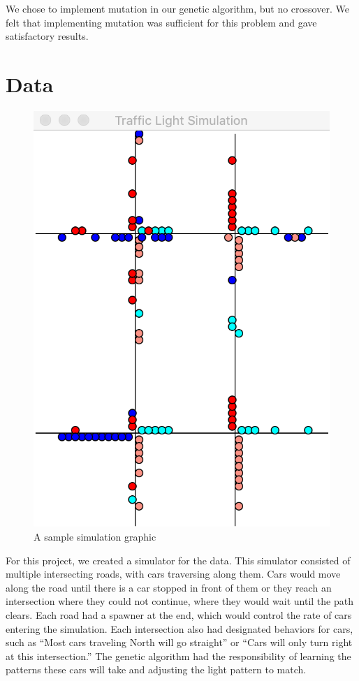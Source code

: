 \documentclass[12pt, letterpaper]{article}
\begin{document}
We chose to implement mutation in our genetic algorithm, but no crossover. 
We felt that implementing mutation was sufficient for this problem and gave satisfactory results.


\section*{Data}

\begin{figure}
\begin{center}
	\includegraphics[scale=0.5]{screenshot.png}
	\caption{A sample simulation graphic}
\end{center}
\end{figure}

For this project, we created a simulator for the data.
This simulator consisted of multiple intersecting roads, with cars traversing along them.
Cars would move along the road until there is a car stopped in front of them or they reach an intersection where they could not continue, where they would wait until the path clears.
Each road had a spawner at the end, which would control the rate of cars entering the simulation.
Each intersection also had designated behaviors for cars, such as ``Most cars traveling North will go straight'' or ``Cars will only turn right at this intersection.''
The genetic algorithm had the responsibility of learning the patterns these cars will take and adjusting the light pattern to match.
\end{document}

